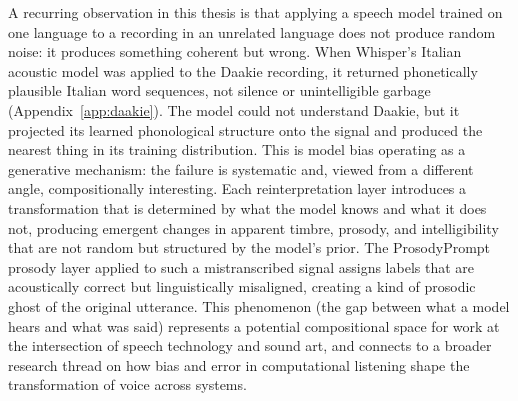 A recurring observation in this thesis is that applying a speech model trained
on one language to a recording in an unrelated language does not produce random
noise: it produces something coherent but wrong. When Whisper's Italian
acoustic model was applied to the Daakie recording, it returned phonetically
plausible Italian word sequences, not silence or unintelligible garbage
(Appendix~\ref{app:daakie}). The model could not understand Daakie, but it
projected its learned phonological structure onto the signal and produced the
nearest thing in its training distribution. This is model bias operating as a
generative mechanism: the failure is systematic and, viewed from a different
angle, compositionally interesting. Each reinterpretation layer introduces a
transformation that is determined by what the model knows and what it does not,
producing emergent changes in apparent timbre, prosody, and intelligibility that
are not random but structured by the model's prior. The ProsodyPrompt prosody
layer applied to such a mistranscribed signal assigns labels that are acoustically
correct but linguistically misaligned, creating a kind of prosodic ghost of the
original utterance. This phenomenon (the gap between what a model hears and
what was said) represents a potential compositional space for work at the
intersection of speech technology and sound art, and connects to a broader
research thread on how bias and error in computational listening shape the
transformation of voice across systems.


\newpage
